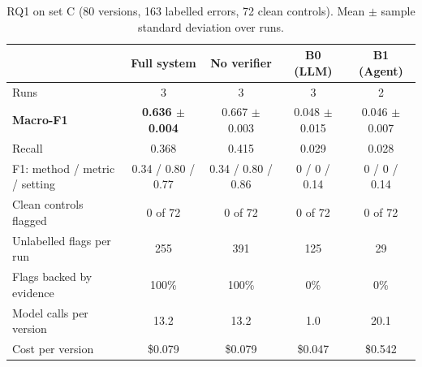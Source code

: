 \documentclass[11pt,a4paper]{article}
\begin{document}
\begin{table}[h]
\centering\small
\caption{RQ1 on set C (80 versions, 163 labelled errors, 72 clean controls). Mean $\pm$ sample
standard deviation over runs.}
\label{tab:rq1}
\begin{tabular}{@{}lcccc@{}}
\toprule
 & Full system & No verifier & B0 (LLM) & B1 (Agent) \\
\midrule
Runs & 3 & 3 & 3 & 2 \\
\textbf{Macro-F1} & \textbf{0.636 $\pm$ 0.004} & 0.667 $\pm$ 0.003 & 0.048 $\pm$ 0.015 & 0.046 $\pm$ 0.007 \\
Recall & 0.368 & 0.415 & 0.029 & 0.028 \\
F1: method / metric / setting & 0.34 / 0.80 / 0.77 & 0.34 / 0.80 / 0.86 & 0 / 0 / 0.14 & 0 / 0 / 0.14 \\
Clean controls flagged & 0 of 72 & 0 of 72 & 0 of 72 & 0 of 72 \\
Unlabelled flags per run & 255 & 391 & 125 & 29 \\
Flags backed by evidence & 100\% & 100\% & 0\% & 0\% \\
Model calls per version & 13.2 & 13.2 & 1.0 & 20.1 \\
Cost per version & \$0.079 & \$0.079 & \$0.047 & \$0.542 \\
\bottomrule
\end{tabular}
\end{table}
\end{document}

